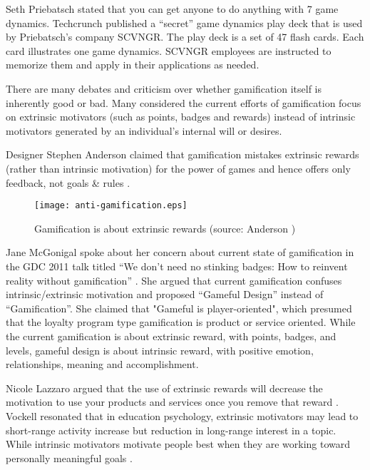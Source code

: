 Seth Priebatsch \cite {Priebatsch2010ted} stated that you can get anyone to do anything with 7 game dynamics. Techcrunch \cite{Biggs2010} published a ``secret'' game dynamics play deck that is used by Priebatsch's company SCVNGR. The play deck is a set of 47 flash cards. Each card illustrates one game dynamics. SCVNGR employees are instructed to memorize them and apply in their applications as needed.  

There are many debates and criticism over whether gamification itself is inherently good or bad. 
Many considered the current efforts of gamification focus on extrinsic motivators (such as points, badges and rewards) instead of intrinsic motivators generated by an individual's internal will or desires.

Designer Stephen Anderson claimed that gamification mistakes extrinsic rewards (rather than intrinsic motivation) for the power of games and hence offers only feedback, not goals \& rules \cite {anderson2011}. 

\begin{figure}[ht!]
	\centering
		\texttt{[image: anti-gamification.eps]}
		\caption{Gamification is about extrinsic rewards (source: Anderson \cite {anderson2011})}
		\label{fig:anti-gamification}
\end{figure}

Jane McGonigal spoke about her concern about current state of gamification in the GDC 2011 talk titled ``We don't need no stinking badges: How to reinvent reality without gamification'' \cite {mcgonigal2011}. She argued that current gamification confuses intrinsic/extrinsic motivation and proposed ``Gameful Design'' instead of ``Gamification''. She claimed that "Gameful is player-oriented", which presumed that the loyalty program type gamification is product or service oriented. While the current gamification is about extrinsic reward, with points, badges, and levels, gameful design is about intrinsic reward, with positive emotion, relationships, meaning and accomplishment.

Nicole Lazzaro argued that the use of extrinsic rewards will decrease the motivation to use your products and services once you remove that reward \cite {Lazzaro2011}. Vockell resonated that in education psychology, extrinsic motivators may lead to short-range activity increase but reduction in long-range interest in a topic. While intrinsic motivators motivate people best when they are working toward personally meaningful goals \cite{vockell2004educational}. 

